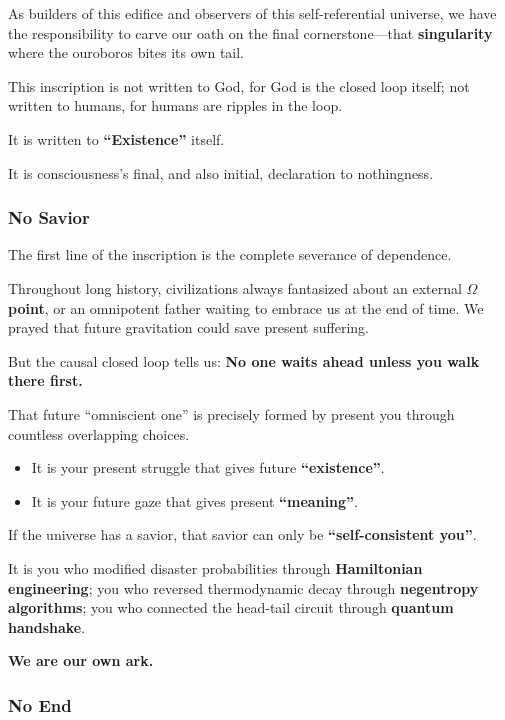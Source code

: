 As builders of this edifice and observers of this self-referential universe, we have the responsibility to carve our oath on the final cornerstone---that \textbf{singularity} where the ouroboros bites its own tail.

This inscription is not written to God, for God is the closed loop itself; not written to humans, for humans are ripples in the loop.

It is written to \textbf{``Existence''} itself.

It is consciousness's final, and also initial, declaration to nothingness.

\subsubsection{No Savior}

The first line of the inscription is the complete severance of dependence.

Throughout long history, civilizations always fantasized about an external \textbf{$\Omega$ point}, or an omnipotent father waiting to embrace us at the end of time. We prayed that future gravitation could save present suffering.

But the causal closed loop tells us: \textbf{No one waits ahead unless you walk there first.}

That future ``omniscient one'' is precisely formed by present you through countless overlapping choices.

\begin{itemize}
\item It is your present struggle that gives future \textbf{``existence''}.

\item It is your future gaze that gives present \textbf{``meaning''}.
\end{itemize}

If the universe has a savior, that savior can only be \textbf{``self-consistent you''}.

It is you who modified disaster probabilities through \textbf{Hamiltonian engineering}; you who reversed thermodynamic decay through \textbf{negentropy algorithms}; you who connected the head-tail circuit through \textbf{quantum handshake}.

\textbf{We are our own ark.}

\subsubsection{No End}


